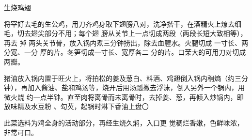 \begin{recipe}[生烧大转弯]{生烧鸡翅}

\ingredients


\cooking

\step 将宰好去毛的生公鸡，用刀齐鸡身取下翅膀八对，洗净揩干，在酒精火上燎去细
毛，切去翅尖部分不用；每个翅 膀从关节上一点切成两段（两段长短大致相等），再去
掉 两头关节骨，放入锅内煮三分钟捞出，除去血腥水。火腿切成 一寸长、两分宽、一分
厚的片。冬笋切成一寸长、宽厚各二 分的片。口茉大的可用刀对切成两瓣。

\step 猪油放入锅内置于旺火上，将拍松的姜及葱白、料酒、鸡翅倒入锅内稍熵（约三分
钟），再加入酱油、盐和鸡汤等，烧开后用汤瓢撇去浮沫，倒入另外一个锅内，用微火烧
约一点半钟。直至肉将离骨而未离骨时，去掉姜、葱，再倾入炒锅内，即放味精及水豆粉
、勾芡，起锅时淋下香油上盘〇

\notes

此菜选料为鸡全身的活动部分，再经生烧久焖，入口更 觉稠烂香嫩，色鲜味浓，非常可口。

\end{recipe}

